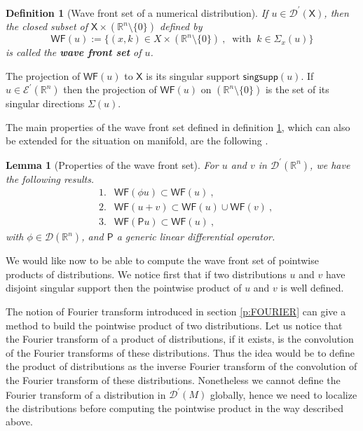 \documentclass[11pt]{book}
\newcommand{\WF}{\mathsf{WF}}
\newcommand{\Dcal}{\mathcal{D}}
\newcommand{\Ecal}{\mathcal{E}}
\newcommand{\Rbb}{\mathbb{R}}
\newcommand{\Psf}{\mathsf{P}}
\newcommand{\Xsf}{\mathsf{X}}
\theoremstyle{break}
\newtheorem{lemma}{Lemma}[chapter]
\newtheorem{definition}{Definition}[chapter]
\begin{document}
\begin{definition}[Wave front set of a numerical distribution]\label{def:wf}
If $u \in \Dcal^\prime(\Xsf)$, then the closed subset of $\Xsf \times (\Rbb^n \setminus \{0\})$ defined by
%
\begin{equation*}
\WF(u) := \bigg\{ (x,k) \in X \times (\Rbb^n \setminus \{0\}) \ , \ \mbox{ with } \ k \in \Sigma_x(u) \bigg\}
\end{equation*}
%
is called the \textbf{wave front set} of $u$.  
\end{definition}


The projection of $\WF(u)$ to $\Xsf$ is its singular support $\mathsf{singsupp}(u)$. If $u \in \Ecal^\prime(\Rbb^n)$ then the projection of $\WF(u)$ on $(\Rbb^n \setminus \{0\})$ is the set of its singular directions $\Sigma(u)$. 


The main properties of the wave front set defined in definition \ref{def:wf}, which can also be extended for the situation on manifold, are the following \cite{HORMANDER_1990}.


\begin{lemma}[Properties of the wave front set]\label{lem:prop_wf}
For $u$ and $v$ in $\Dcal^\prime(\Rbb^n)$, we have the following results.
%
\begin{eqnarray*}
&1.& \WF(\phi u) \subset \WF(u) \ , \\
&2.& \WF(u+v) \subset \WF(u) \cup \WF(v) \ , \\ 
&3.& \WF(\Psf u) \subset \WF(u) \ , 
\end{eqnarray*}
%
with $\phi\in\Dcal(\Rbb^n)$, and $\Psf$ a generic linear differential operator. 
\end{lemma}


\bigskip


We would like now to be able to compute the wave front set of pointwise products of distributions. We notice first that if two distributions $u$ and $v$ have disjoint singular support then the pointwise product of $u$ and $v$ is well defined.


\bigskip


The notion of Fourier transform introduced in section \ref{p:FOURIER} can give a method to build the pointwise product of two distributions. Let us notice that the Fourier transform of a product of distributions, if it exists, is the convolution of the Fourier transforms of these distributions. Thus the idea would be to define the product of distributions as the inverse Fourier transform of the convolution of the Fourier transform of these distributions. Nonetheless we cannot define the Fourier transform of a distribution in $\Dcal^\prime(M)$ globally, hence we need to localize the distributions before computing the pointwise product in the way described above. 
\end{document}
